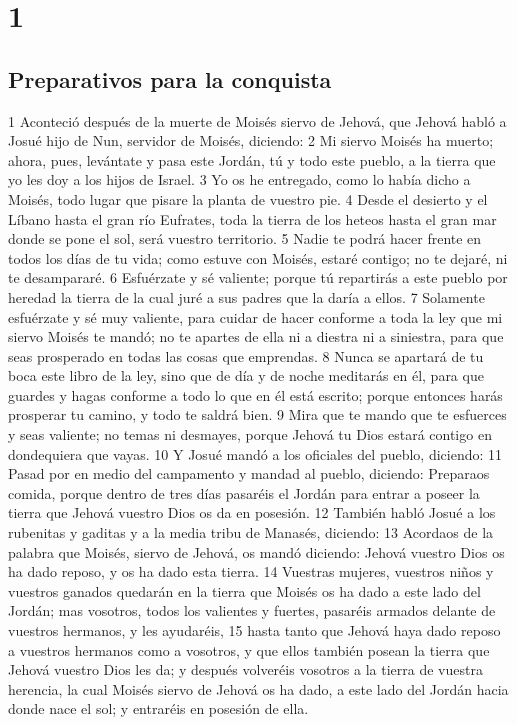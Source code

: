 
\chapter{1}

\section*{Preparativos para la conquista}

1 Aconteció después de la muerte de Moisés siervo de Jehová, que Jehová habló a Josué hijo de Nun, servidor de Moisés, diciendo:
2 Mi siervo Moisés ha muerto; ahora, pues, levántate y pasa este Jordán, tú y todo este pueblo, a la tierra que yo les doy a los hijos de Israel.
3 Yo os he entregado, como lo había dicho a Moisés, todo lugar que pisare la planta de vuestro pie.
4 Desde el desierto y el Líbano hasta el gran río Eufrates, toda la tierra de los heteos hasta el gran mar donde se pone el sol, será vuestro territorio.
5 Nadie te podrá hacer frente en todos los días de tu vida; como estuve con Moisés, estaré contigo; no te dejaré, ni te desampararé.
6 Esfuérzate y sé valiente; porque tú repartirás a este pueblo por heredad la tierra de la cual juré a sus padres que la daría a ellos.
7 Solamente esfuérzate y sé muy valiente, para cuidar de hacer conforme a toda la ley que mi siervo Moisés te mandó; no te apartes de ella ni a diestra ni a siniestra, para que seas prosperado en todas las cosas que emprendas.
8 Nunca se apartará de tu boca este libro de la ley, sino que de día y de noche meditarás en él, para que guardes y hagas conforme a todo lo que en él está escrito; porque entonces harás prosperar tu camino, y todo te saldrá bien.
9 Mira que te mando que te esfuerces y seas valiente; no temas ni desmayes, porque Jehová tu Dios estará contigo en dondequiera que vayas.
10 Y Josué mandó a los oficiales del pueblo, diciendo:
11 Pasad por en medio del campamento y mandad al pueblo, diciendo: Preparaos comida, porque dentro de tres días pasaréis el Jordán para entrar a poseer la tierra que Jehová vuestro Dios os da en posesión.
12 También habló Josué a los rubenitas y gaditas y a la media tribu de Manasés, diciendo:
13 Acordaos de la palabra que Moisés, siervo de Jehová, os mandó diciendo: Jehová vuestro Dios os ha dado reposo, y os ha dado esta tierra.
14 Vuestras mujeres, vuestros niños y vuestros ganados quedarán en la tierra que Moisés os ha dado a este lado del Jordán; mas vosotros, todos los valientes y fuertes, pasaréis armados delante de vuestros hermanos, y les ayudaréis,
15 hasta tanto que Jehová haya dado reposo a vuestros hermanos como a vosotros, y que ellos también posean la tierra que Jehová vuestro Dios les da; y después volveréis vosotros a la tierra de vuestra herencia, la cual Moisés siervo de Jehová os ha dado, a este lado del Jordán hacia donde nace el sol; y entraréis en posesión de ella. 
